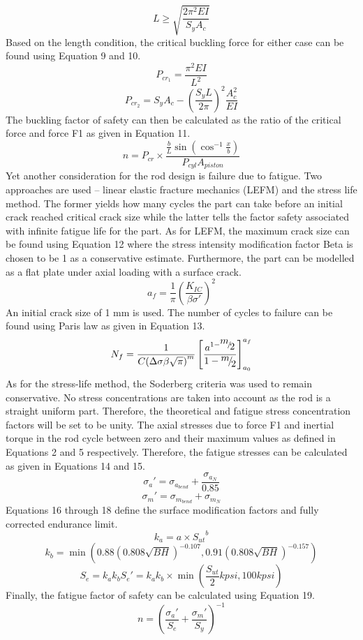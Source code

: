 \documentclass[10pt,a4paper]{article}
\begin{document}
\[L \ge \sqrt {\frac{{2{\pi ^2}EI}}{{{S_y}{A_c}}}} \]
Based on the length condition, the critical buckling force for either case can be found using Equation 9 and 10.
\[{P_{c{r_1}}} = \frac{{{\pi ^2}EI}}{{{L^2}}}\]
\[{P_{c{r_2}}} = {S_y}{A_c} - {\left( {\frac{{{S_y}L}}{{2\pi }}} \right)^2}\frac{{A_c^2}}{{EI}}\]
The buckling factor of safety can then be calculated as the ratio of the critical force and force F1 as given in Equation 11.
\[n = {P_{cr}} \times \frac{{\frac{b}{L}\sin ({{\cos }^{ - 1}}\frac{x}{b})}}{{{P_{cyl}}{A_{piston}}}}\]
Yet another consideration for the rod design is failure due to fatigue. Two approaches are used – linear elastic fracture mechanics (LEFM) and the stress life method. The former yields how many cycles the part can take before an initial crack reached critical crack size while the latter tells the factor safety associated with infinite fatigue life for the part.
As for LEFM, the maximum crack size can be found using Equation 12 where the stress intensity modification factor Beta is chosen to be 1 as a conservative estimate. Furthermore, the part can be modelled as a flat plate under axial loading with a surface crack.
\[{a_f} = \frac{1}{\pi }{\left( {\frac{{{K_{IC}}}}{{\beta \sigma '}}} \right)^2}\]
An initial crack size of 1 mm is used. The number of cycles to failure can be found using Paris law as given in Equation 13.
\[{N_f} = \frac{1}{{C{{\left( {\Delta \sigma \beta \sqrt \pi  } \right)}^m}}}\left[ {\frac{{{a^{1 - {\raise0.7ex\hbox{$m$} \!\mathord{\left/
 {\vphantom {m 2}}\right.\kern-\nulldelimiterspace}
\!\lower0.7ex\hbox{$2$}}}}}}{{1 - {\raise0.7ex\hbox{$m$} \!\mathord{\left/
 {\vphantom {m 2}}\right.\kern-\nulldelimiterspace}
\!\lower0.7ex\hbox{$2$}}}}} \right]_{{a_0}}^{{a_f}}\]
As for the stress-life method, the Soderberg criteria was used to remain conservative. No stress concentrations are taken into account as the rod is a straight uniform part. Therefore, the theoretical and fatigue stress concentration factors will be set to be unity. The axial stresses due to force F1 and inertial torque in the rod cycle between zero and their maximum values as defined in Equations 2 and 5 respectively. Therefore, the fatigue stresses can be calculated as given in Equations 14 and 15.
\[{\sigma _a}' = {\sigma _{{a_{bend}}}} + \frac{{{\sigma _{{a_N}}}}}{{0.85}}\]
\[{\sigma _m}' = {\sigma _{{m_{bend}}}} + {\sigma _{{m_N}}}\]
Equations 16 through 18 define the surface modification factors and fully corrected endurance limit.
\[{k_a} = a \times {S_{ut}}^b\]
\[{k_b} = \min \left( {0.88{{\left( {0.808\sqrt {BH} } \right)}^{ - 0.107}},0.91{{\left( {0.808\sqrt {BH} } \right)}^{ - 0.157}}} \right)\]
\[{S_e} = {k_a}{k_b}{S_e}' = {k_a}{k_b} \times \min \left( {\frac{{{S_{ut}}}}{2}kpsi,100kpsi} \right)\]
Finally, the fatigue factor of safety can be calculated using Equation 19.
\[n = {\left( {\frac{{{\sigma _a}'}}{{{S_e}}} + \frac{{{\sigma _m}'}}{{{S_y}}}} \right)^{ - 1}}\]
\end{document}
